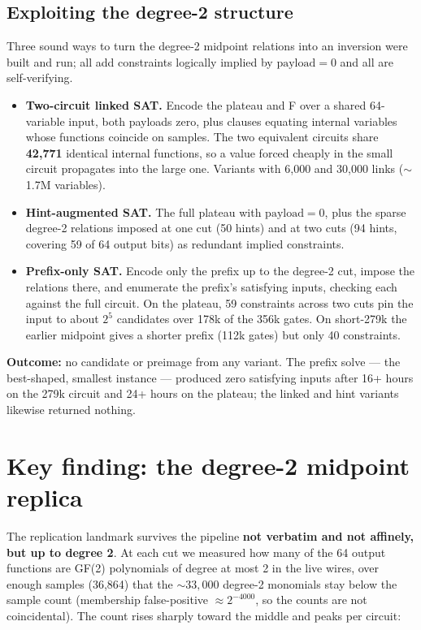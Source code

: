 \documentclass[11pt]{article}
\begin{document}
\subsection{Exploiting the degree-2 structure}
Three sound ways to turn the degree-2 midpoint relations into an inversion were built
and run; all add constraints logically implied by $\text{payload}=0$ and all are
self-verifying.
\begin{itemize}[leftmargin=1.4em]
\item \textbf{Two-circuit linked SAT.} Encode the plateau and F over a shared
  64-variable input, both payloads zero, plus clauses equating internal variables whose
  functions coincide on samples. The two equivalent circuits share \textbf{42{,}771}
  identical internal functions, so a value forced cheaply in the small circuit
  propagates into the large one. Variants with 6{,}000 and 30{,}000 links ($\sim$1.7M
  variables).
\item \textbf{Hint-augmented SAT.} The full plateau with $\text{payload}=0$, plus the
  sparse degree-2 relations imposed at one cut (50 hints) and at two cuts (94 hints,
  covering 59 of 64 output bits) as redundant implied constraints.
\item \textbf{Prefix-only SAT.} Encode only the prefix up to the degree-2 cut, impose
  the relations there, and enumerate the prefix's satisfying inputs, checking each
  against the full circuit. On the plateau, 59 constraints across two cuts pin the input
  to about $2^{5}$ candidates over 178k of the 356k gates. On short-279k the earlier
  midpoint gives a shorter prefix (112k gates) but only 40 constraints.
\end{itemize}
\textbf{Outcome:} no candidate or preimage from any variant. The prefix solve --- the
best-shaped, smallest instance --- produced zero satisfying inputs after 16+ hours on
the 279k circuit and 24+ hours on the plateau; the linked and hint variants likewise
returned nothing.

\section{Key finding: the degree-2 midpoint replica}
\label{sec:finding}

The replication landmark survives the pipeline \textbf{not verbatim and not affinely,
but up to degree 2}. At each cut we measured how many of the 64 output functions are
GF(2) polynomials of degree at most 2 in the live wires, over enough samples (36{,}864)
that the ${\sim}33{,}000$ degree-2 monomials stay below the sample count (membership
false-positive $\approx 2^{-4000}$, so the counts are not coincidental). The count rises
sharply toward the middle and peaks per circuit:
\end{document}
